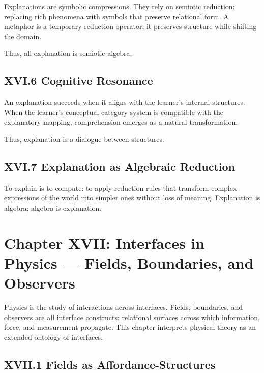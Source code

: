 \documentclass[11pt,letterpaper]{article}
\begin{document}
Explanations are symbolic compressions. They rely on semiotic reduction: replacing rich phenomena with symbols that preserve relational form. A metaphor is a temporary reduction operator; it preserves structure while shifting the domain.

Thus, all explanation is semiotic algebra.

\subsection{XVI.6 Cognitive Resonance}

An explanation succeeds when it aligns with the learner’s internal structures. When the learner’s conceptual category system is compatible with the explanatory mapping, comprehension emerges as a natural transformation.

Thus, explanation is a dialogue between structures.

\subsection{XVI.7 Explanation as Algebraic Reduction}

To explain is to compute: to apply reduction rules that transform complex expressions of the world into simpler ones without loss of meaning. Explanation is algebra; algebra is explanation.

\newpage

\section{Chapter XVII: Interfaces in Physics — Fields, Boundaries, and Observers}

Physics is the study of interactions across interfaces. Fields, boundaries, and observers are all interface constructs: relational surfaces across which information, force, and measurement propagate. This chapter interprets physical theory as an extended ontology of interfaces.

\subsection{XVII.1 Fields as Affordance-Structures}
\end{document}
